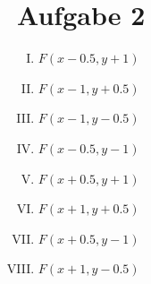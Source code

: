 \documentclass[a4paper,10pt]{article}
\begin{document}
	\section*{Aufgabe 2}

	\begin{enumerate}[(I)]
		\item $F(x - 0.5, y + 1)$
		\item $F(x - 1, y + 0.5)$
		\item $F(x - 1, y - 0.5)$
		\item $F(x - 0.5, y - 1)$
		\item $F(x + 0.5, y + 1)$
		\item $F(x + 1, y + 0.5)$
		\item $F(x + 0.5, y - 1)$
		\item $F(x + 1, y - 0.5)$
	\end{enumerate}
\end{document}
